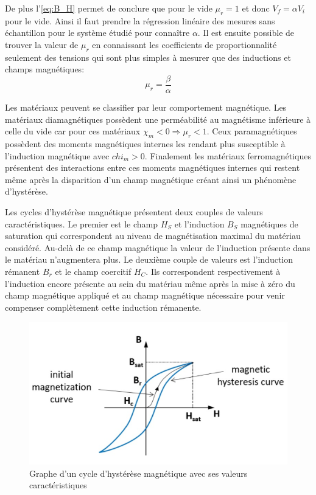 De plus l'\autoref{eq:B_H} permet de conclure que pour le vide \(\mu_r = 1\) et donc \(V_f = \alpha V_i\) pour le vide. Ainsi il faut prendre la régression linéaire des mesures sans échantillon pour le système étudié pour connaître \(\alpha\). Il est ensuite possible de trouver la valeur de \(\mu_r\) en connaissant les coefficients de proportionnalité seulement des tensions qui sont plus simples à mesurer que des inductions et champs magnétiques:
\begin{equation} 
    \mu_r = \frac{\beta}{\alpha}
    \label{eq:mu_r}
\end{equation} 


Les matériaux peuvent se classifier par leur comportement magnétique. Les matériaux diamagnétiques possèdent une perméabilité au magnétisme inférieure à celle du vide car pour ces matériaux \(\chi_m < 0 \Rightarrow \mu_r < 1\). Ceux paramagnétiques possèdent des moments magnétiques internes les rendant plus susceptible à l'induction magnétique avec \(chi_m > 0\). Finalement les matériaux ferromagnétiques présentent des interactions entre ces moments magnétiques internes qui restent même après la disparition d'un champ magnétique créant ainsi un phénomène d'hystérèse.

Les cycles d'hystérèse magnétique présentent deux couples de valeurs caractéristiques. Le premier est le champ \(H_S\) et l'induction \(B_S\) magnétiques de saturation qui correspondent au niveau de magnétisation maximal du matériau considéré. Au-delà de ce champ magnétique la valeur de l'induction présente dans le matériau n'augmentera plus. Le deuxième couple de valeurs est l'induction rémanent \(B_r\) et le champ coercitif \(H_C\). Ils correspondent respectivement à l'induction encore présente au sein du matériau même après la mise à zéro du champ magnétique appliqué et au champ magnétique nécessaire pour venir compenser complètement cette induction rémanente.
\begin{figure}[h]
    \centering
    \includegraphics[width=0.7\linewidth]{figures/cycle_hysterese.png}
    \caption{Graphe d'un cycle d'hystérèse magnétique avec ses valeurs caractéristiques \cite{graph_cycle}}
    \label{fig:cycle}
\end{figure}